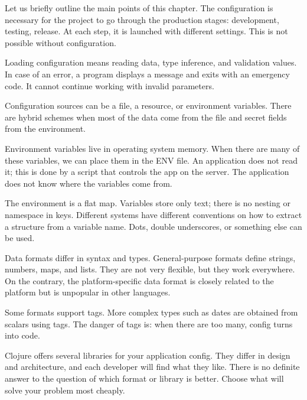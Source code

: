 Let us briefly outline the main points of this chapter. The configuration is necessary for the project to go through the production stages: development, testing, release. At each step, it is launched with different settings. This is not possible without configuration.

Loading configuration means reading data, type inference, and validation values. In case of an error, a program displays a message and exits with an emergency code. It cannot continue working with invalid parameters.

Configuration sources can be a file, a resource, or environment variables. There are hybrid schemes when most of the data come from the file and secret fields from the environment.

Environment variables live in operating system memory. When there are many of these variables, we can place them in the ENV file. An application does not read it; this is done by a script that controls the app on the server. The application does not know where the variables come from.

The environment is a flat map. Variables store only text; there is no nesting or namespace in keys. Different systems have different conventions on how to extract a structure from a variable name. Dots, double underscores, or something else can be used.

Data formats differ in syntax and types. General-purpose formats define strings, numbers, maps, and lists. They are not very flexible, but they work everywhere. On the contrary, the platform-specific data format is closely related to the platform but is unpopular in other languages.

Some formats support tags. More complex types such as dates are obtained from scalars using tags. The danger of tags is: when there are too many, config turns into code.

Clojure offers several libraries for your application config. They differ in design and architecture, and each developer will find what they like. There is no definite answer to the question of which format or library is better. Choose what will solve your problem most cheaply.
